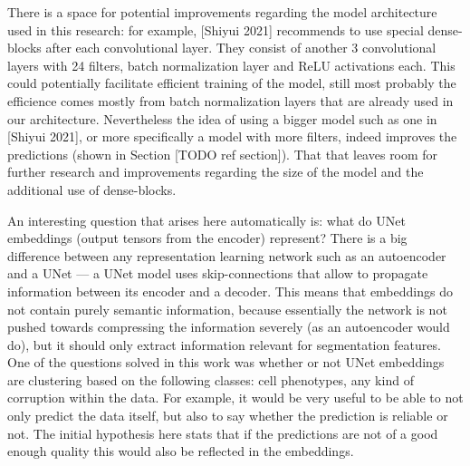 There is a space for potential improvements regarding the model architecture used in this research: for example, [Shiyui 2021] recommends to use special dense-blocks after each convolutional layer. They consist of another 3 convolutional layers with 24 filters, batch normalization layer and ReLU activations each. This could potentially facilitate efficient training of the model, still most probably the efficience comes mostly from batch normalization layers that are already used in our architecture. Nevertheless the idea of using a bigger model such as one in [Shiyui 2021], or more specifically a model with more filters, indeed improves the predictions (shown in Section [TODO ref section]). That that leaves room for further research and improvements regarding the size of the model and the additional use of dense-blocks.

An interesting question that arises here automatically is: what do UNet embeddings (output tensors from the encoder) represent? There is a big difference between any representation learning network such as an autoencoder and a UNet --- a UNet model uses skip-connections that allow to propagate information between its encoder and a decoder. This means that embeddings do not contain purely semantic information, because essentially the network is not pushed towards compressing the information severely (as an autoencoder would do), but it should only extract information relevant for segmentation features. One of the questions solved in this work was whether or not UNet embeddings are clustering based on the following classes: cell phenotypes, any kind of corruption within the data. For example, it would be very useful to be able to not only predict the data itself, but also to say whether the prediction is reliable or not. The initial hypothesis here stats that if the predictions are not of a good enough quality this would also be reflected in the embeddings.